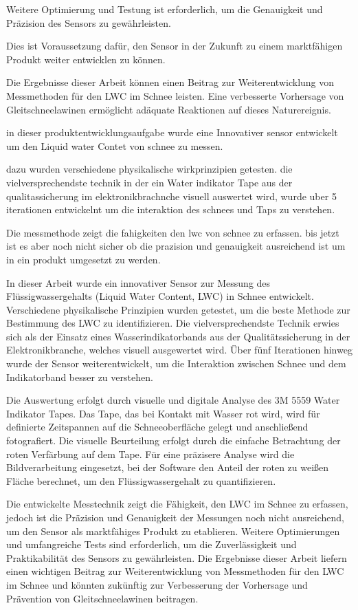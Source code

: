 Weitere Optimierung und Testung ist erforderlich, um die Genauigkeit und Präzision des Sensors zu gewährleisten.

Dies ist Voraussetzung dafür, den Sensor in der Zukunft zu einem marktfähigen Produkt weiter entwicklen zu können.

Die Ergebnisse dieser Arbeit können einen Beitrag zur Weiterentwicklung von Messmethoden für den LWC im Schnee leisten. Eine  verbesserte Vorhersage von Gleitschneelawinen ermöglicht adäquate Reaktionen auf dieses Naturereignis. 




in dieser produktentwicklungsaufgabe wurde eine Innovativer sensor entwickelt um den Liquid water Contet von schnee zu messen.

dazu wurden verschiedene physikalische wirkprinzipien getesten. die vielversprechendste technik in der ein Water indikator Tape aus der qualitassicherung im elektronikbrachnche visuell auswertet wird, wurde uber 5 iterationen entwickelnt um die interaktion des schnees und Taps zu verstehen.


Die messmethode zeigt die fahigkeiten den lwc von schnee zu erfassen. bis jetzt ist es aber noch nicht sicher ob die prazision und genauigkeit ausreichend ist um in ein produkt umgesetzt zu werden.


In dieser Arbeit wurde ein innovativer Sensor zur Messung des Flüssigwassergehalts (Liquid Water Content, LWC) in Schnee entwickelt. Verschiedene physikalische Prinzipien wurden getestet, um die beste Methode zur Bestimmung des LWC zu identifizieren. Die vielversprechendste Technik erwies sich als der Einsatz eines Wasserindikatorbands aus der Qualitätssicherung in der Elektronikbranche, welches visuell ausgewertet wird. Über fünf Iterationen hinweg wurde der Sensor weiterentwickelt, um die Interaktion zwischen Schnee und dem Indikatorband besser zu verstehen.

Die Auswertung erfolgt durch visuelle und digitale Analyse des 3M 5559 Water Indikator Tapes. Das Tape, das bei Kontakt mit Wasser rot wird, wird für definierte Zeitspannen auf die Schneeoberfläche gelegt und anschließend fotografiert. Die visuelle Beurteilung erfolgt durch die einfache Betrachtung der roten Verfärbung auf dem Tape. Für eine präzisere Analyse wird die Bildverarbeitung eingesetzt, bei der Software den Anteil der roten zu weißen Fläche berechnet, um den Flüssigwassergehalt zu quantifizieren.

Die entwickelte Messtechnik zeigt die Fähigkeit, den LWC im Schnee zu erfassen, jedoch ist die Präzision und Genauigkeit der Messungen noch nicht ausreichend, um den Sensor als marktfähiges Produkt zu etablieren. Weitere Optimierungen und umfangreiche Tests sind erforderlich, um die Zuverlässigkeit und Praktikabilität des Sensors zu gewährleisten. Die Ergebnisse dieser Arbeit liefern einen wichtigen Beitrag zur Weiterentwicklung von Messmethoden für den LWC im Schnee und könnten zukünftig zur Verbesserung der Vorhersage und Prävention von Gleitschneelawinen beitragen.

\fi
